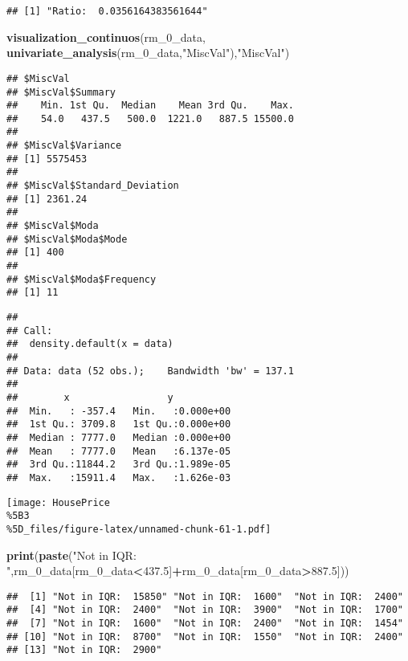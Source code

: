\documentclass[
]{article}
\newenvironment{Shaded}{\begin{snugshade}}{\end{snugshade}}
\newcommand{\FloatTok}[1]{\textcolor[rgb]{0.00,0.00,0.81}{#1}}
\newcommand{\FunctionTok}[1]{\textcolor[rgb]{0.13,0.29,0.53}{\textbf{#1}}}
\newcommand{\NormalTok}[1]{#1}
\newcommand{\SpecialCharTok}[1]{\textcolor[rgb]{0.81,0.36,0.00}{\textbf{#1}}}
\newcommand{\StringTok}[1]{\textcolor[rgb]{0.31,0.60,0.02}{#1}}
\begin{document}
\begin{verbatim}
## [1] "Ratio:  0.0356164383561644"
\end{verbatim}

\begin{Shaded}
\begin{Highlighting}[]
\FunctionTok{visualization\_continuos}\NormalTok{(rm\_0\_data, }\FunctionTok{univariate\_analysis}\NormalTok{(rm\_0\_data,}\StringTok{"MiscVal"}\NormalTok{),}\StringTok{"MiscVal"}\NormalTok{)}
\end{Highlighting}
\end{Shaded}

\begin{verbatim}
## $MiscVal
## $MiscVal$Summary
##    Min. 1st Qu.  Median    Mean 3rd Qu.    Max. 
##    54.0   437.5   500.0  1221.0   887.5 15500.0 
## 
## $MiscVal$Variance
## [1] 5575453
## 
## $MiscVal$Standard_Deviation
## [1] 2361.24
## 
## $MiscVal$Moda
## $MiscVal$Moda$Mode
## [1] 400
## 
## $MiscVal$Moda$Frequency
## [1] 11
\end{verbatim}

\begin{verbatim}
## 
## Call:
##  density.default(x = data)
## 
## Data: data (52 obs.);    Bandwidth 'bw' = 137.1
## 
##        x                 y            
##  Min.   : -357.4   Min.   :0.000e+00  
##  1st Qu.: 3709.8   1st Qu.:0.000e+00  
##  Median : 7777.0   Median :0.000e+00  
##  Mean   : 7777.0   Mean   :6.137e-05  
##  3rd Qu.:11844.2   3rd Qu.:1.989e-05  
##  Max.   :15911.4   Max.   :1.626e-03
\end{verbatim}

\texttt{[image: HousePrice\\\%5B3\\\%5D\_files/figure-latex/unnamed-chunk-61-1.pdf]}

\begin{Shaded}
\begin{Highlighting}[]
\FunctionTok{print}\NormalTok{(}\FunctionTok{paste}\NormalTok{(}\StringTok{"Not in IQR: "}\NormalTok{,rm\_0\_data[rm\_0\_data}\SpecialCharTok{\textless{}}\FloatTok{437.5}\NormalTok{]}\SpecialCharTok{+}\NormalTok{rm\_0\_data[rm\_0\_data}\SpecialCharTok{\textgreater{}}\FloatTok{887.5}\NormalTok{]))}
\end{Highlighting}
\end{Shaded}

\begin{verbatim}
##  [1] "Not in IQR:  15850" "Not in IQR:  1600"  "Not in IQR:  2400" 
##  [4] "Not in IQR:  2400"  "Not in IQR:  3900"  "Not in IQR:  1700" 
##  [7] "Not in IQR:  1600"  "Not in IQR:  2400"  "Not in IQR:  1454" 
## [10] "Not in IQR:  8700"  "Not in IQR:  1550"  "Not in IQR:  2400" 
## [13] "Not in IQR:  2900"
\end{verbatim}
\end{document}

